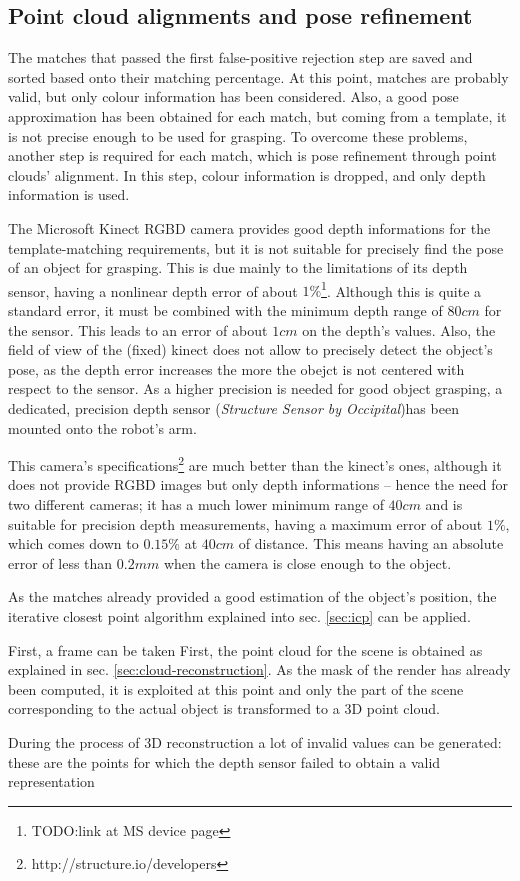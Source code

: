 \subsection{Point cloud alignments and pose refinement}
The matches that passed the first false-positive rejection step are saved and
sorted based onto their matching percentage. At this point, matches are probably
valid, but only colour information has been considered. Also, a good pose
approximation has been obtained for each match, but coming from a template, it
is not precise enough to be used for grasping. To overcome these problems,
another step is required for each match, which is pose refinement through point
clouds' alignment. In this step, colour information is dropped, and only depth
information is used. 

The Microsoft Kinect RGBD camera provides good depth informations for the template-matching
requirements, but it is not suitable for precisely find the pose of an object
for grasping. This is due mainly to the limitations of its depth sensor, having
a nonlinear depth error of about $1\%$\footnote{TODO:link at MS device page}.
Although this is quite a standard error, it must be combined with the minimum
depth range of $80\unit{cm}$ for the sensor. This leads to an error of about
$1\unit{cm}$ on the depth's values. Also, the field of view of the (fixed)
kinect does not allow to precisely detect the object's pose, as the depth error
increases the more the obejct is not centered with respect to the sensor. As a
higher precision is needed for good 
object grasping, a dedicated, precision depth sensor (\emph{Structure Sensor by
Occipital})has been mounted onto the robot's arm.


This camera's specifications\footnote{http://structure.io/developers} are much better than the kinect's ones, although it
does not provide RGBD images but only depth informations -- hence the need for two
different cameras; it has a much lower minimum range of $40\unit{cm}$ and is suitable for
precision depth measurements, having a maximum error of about $1\%$, which comes
down to $0.15\%$ at $40\unit{cm}$ of distance. This means having an absolute
error of less than $0.2\unit{mm}$ when the camera is close enough to the object.

As the matches already provided a good estimation of the object's position, the
iterative closest point algorithm explained into sec. \ref{sec:icp} can be
applied. 

First, a frame can be taken
First, the point cloud %
for the scene is obtained as explained in sec. \ref{sec:cloud-reconstruction}.
As the mask of the render has already been computed, it is exploited at this
point and only the part of the scene corresponding to the actual object is
transformed to a 3D point cloud.

During the process of 3D reconstruction a lot of invalid values can be
generated: these are the points for which the depth sensor failed to obtain a
valid representation

